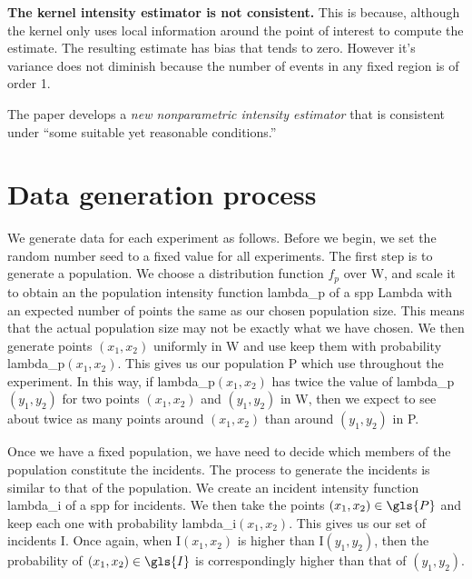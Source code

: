 {
\color{red}
\textbf{The kernel intensity estimator is not consistent.}
This is because, although the kernel only uses local information around the point of interest to compute the estimate.
The resulting estimate has bias that tends to zero.
However it's variance does not diminish because the number of events in any fixed region is of order 1.
}

The paper develops a \textit{new nonparametric intensity estimator} that is consistent under ``some suitable yet reasonable conditions.''


\section{Data generation process}
\label{sec:theory:data generation}

We generate data for each experiment as follows.
Before we begin, we set the random number seed to a fixed value for all experiments.
The first step is to generate a population.
We choose a distribution function \(f_p\) over \gls{W}, and scale it to obtain an the population intensity function \gls{lambda_p} of a \gls{spp} \gls{Lambda} with an expected number of points the same as our chosen population size.
This means that the actual population size may not be exactly what we have chosen.
We then generate points \((x_1, x_2)\) uniformly in \gls{W} and use keep them with probability \gls{lambda_p}\((x_1, x_2)\).
This gives us our population \gls{P} which use throughout the experiment.
In this way,
if \gls{lambda_p}\((x_1, x_2)\) has twice the value of \gls{lambda_p}\((y_1, y_2)\) for two points \((x_1, x_2)\) and \((y_1, y_2)\) in \gls{W},
then we expect to see about twice as many points around \((x_1, x_2)\) than around \((y_1, y_2)\) in \gls{P}.

Once we have a fixed population, we have need to decide which members of the population constitute the incidents.
The process to generate the incidents is similar to that of the population.
We create an incident intensity function \gls{lambda_i} of a \gls{spp} for incidents.
We then take the points \((x_1, x_2) \in \gls{P}\) and keep each one with probability \gls{lambda_i}\((x_1, x_2)\).
This gives us our set of incidents \gls{I}.
Once again, when \gls{I}\((x_1, x_2)\) is higher than \gls{I}\((y_1, y_2)\),
then the probability of \((x_1, x_2) \in \gls{I}\) is correspondingly higher than that of \((y_1, y_2)\).